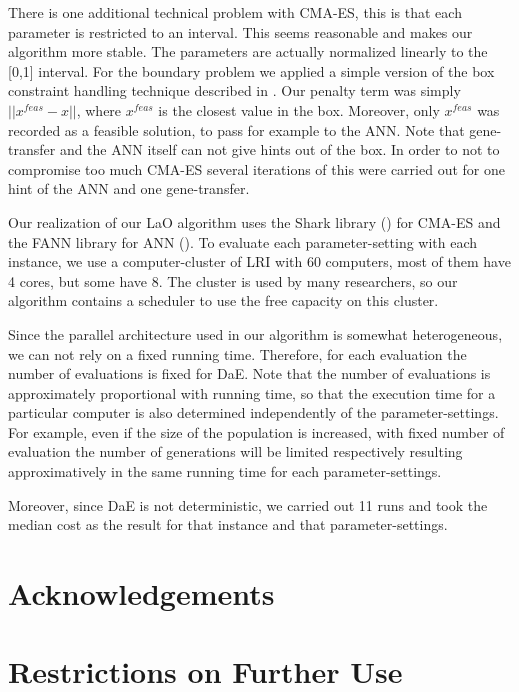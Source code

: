 \documentclass{acm_proc_article-sp}
\begin{document}
There is one additional technical problem with CMA-ES, this is that each parameter is restricted to an interval. This seems reasonable and makes our algorithm more stable. The parameters are actually normalized linearly to the [0,1] interval. For the boundary problem we applied a simple version of the box constraint handling technique described in \cite{hansen2009tec}. Our penalty term was simply \begin{math}||x^{feas}-x|| \end{math}, where \begin{math}x^{feas}\end{math} is the closest value in the box. Moreover, only \begin{math}x^{feas}\end{math} was recorded as a feasible solution, to pass for example to the ANN. Note that gene-transfer and the ANN itself can not give hints out of the box. In order to not to compromise too much CMA-ES several iterations of this were carried out for one hint of the ANN and one gene-transfer.

Our realization of our LaO algorithm uses the Shark library (\cite{shark08}) for CMA-ES and the FANN library for ANN (\cite{nissen}). To evaluate each parameter-setting with each instance, we use a computer-cluster of LRI with 60 computers, most of them have 4 cores, but some have 8. The cluster is used by many researchers, so our algorithm contains a scheduler to use the free capacity on this cluster.

Since the parallel architecture used in our algorithm is somewhat heterogeneous, we can not rely on a fixed running time. Therefore, for each evaluation the number of evaluations is fixed for DaE. Note that the number of evaluations is approximately proportional with running time, so that the execution time for a particular computer is also determined independently of the parameter-settings. For example, even if the size of the population is increased, with fixed number of evaluation the number of generations will be limited respectively resulting approximatively in the same running time for each parameter-settings. 

Moreover, since DaE is not deterministic, we carried out 11 runs and took the median cost as the result for that instance and that parameter-settings.

\section*{Acknowledgements}

\section*{Restrictions on Further Use}



\end{document}
